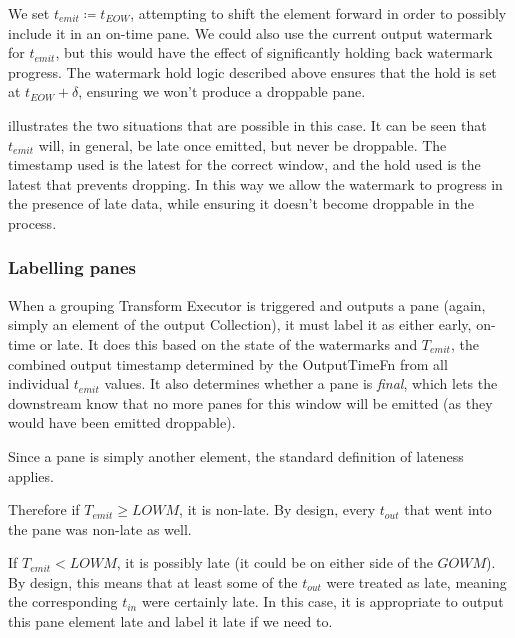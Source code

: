 We set $t_{\mathit{emit}} \coloneq t_{\mathit{EOW}}$, attempting to shift the element forward in order to possibly include it in an on-time pane.
We could also use the current output watermark for $t_{\mathit{emit}}$, but this would have the effect of significantly holding back watermark progress.
The watermark hold logic described above ensures that the hold is set at $t_{\mathit{EOW}} + \delta$, ensuring we won't produce a droppable pane.

 illustrates the two situations that are possible in this case. It can be seen that $t_{\mathit{emit}}$ will, in general, be late once emitted, but never be droppable. 
The timestamp used is the latest for the correct window, and the hold used is the latest that prevents dropping.
In this way we allow the watermark to progress in the presence of late data, while ensuring it doesn't become droppable in the process.

\subsubsection{Labelling panes}



When a grouping Transform Executor is triggered and outputs a pane (again, simply an element of the output Collection), it must label it as either early, on-time or late.
It does this based on the state of the watermarks and $T_{\mathit{emit}}$, the combined output timestamp determined by the OutputTimeFn from all individual $t_{\mathit{emit}}$ values.
It also determines whether a pane is \emph{final}, which lets the downstream know that no more panes for this window will be emitted (as they would have been emitted droppable).

Since a pane is simply another element, the standard definition of lateness applies.

Therefore if $T_{\mathit{emit}} \geq \mathit{LOWM}$, it is non-late.
By design, every $t_{\mathit{out}}$ that went into the pane was non-late as well.

If $T_{\mathit{emit}} < \mathit{LOWM}$, it is possibly late (it could be on either side of the $\mathit{GOWM}$).
By design, this means that at least some of the $t_{\mathit{out}}$ were treated as late, meaning the corresponding $t_{\mathit{in}}$ were certainly late.
In this case, it is appropriate to output this pane element late and label it late if we need to.

